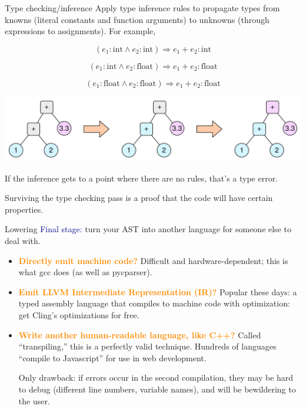 \documentclass[aspectratio=169]{beamer}
\begin{document}
\begin{frame}{Type checking/inference}
\vspace{0.35 cm}
Apply type inference rules to propagate types from knowns (literal constants and function arguments) to unknowns (through expressions to assignments). For example,

\vspace{-0.25 cm}
\[ (e_1: \mbox{int} \wedge e_2: \mbox{int}) \Rightarrow e_1 + e_2: \mbox{int} \]

\vspace{-0.5 cm}
\[ (e_1: \mbox{int} \wedge e_2: \mbox{float}) \Rightarrow e_1 + e_2: \mbox{float} \]

\vspace{-0.5 cm}
\[ (e_1: \mbox{float} \wedge e_2: \mbox{float}) \Rightarrow e_1 + e_2: \mbox{float} \]

\includegraphics[width=\linewidth]{type-inference.pdf}

\vspace{0.25 cm}
If the inference gets to a point where there are no rules, that's a type error.

\vspace{0.1 cm}
Surviving the type checking pass is a proof that the code will have certain properties.
\end{frame}

\begin{frame}{Lowering}
\vspace{0.5 cm}
\textcolor{darkblue}{Final stage:} turn your AST into another language for someone else to deal with.

\vspace{0.25 cm}
\begin{itemize}\setlength{\itemsep}{0.5 cm}
\item \textcolor{darkorange}{\bf Directly emit machine code?} Difficult and hardware-dependent; this is what gcc does (as well as pycparser).

\item \textcolor{darkorange}{\bf Emit LLVM Intermediate Representation (IR)?} Popular these days: a typed assembly language that compiles to machine code with optimization: get Cling's optimizations for free.

\item \textcolor{darkorange}{\bf Write another human-readable language, like C++?} Called ``transpiling,'' this is a perfectly valid technique. Hundreds of languages ``compile to Javascript'' for use in web development.

\vspace{0.25 cm}
Only drawback: if errors occur in the second compilation, they may be hard to debug (different line numbers, variable names), and will be bewildering to the user.
\end{itemize}
\end{frame}
\end{document}

